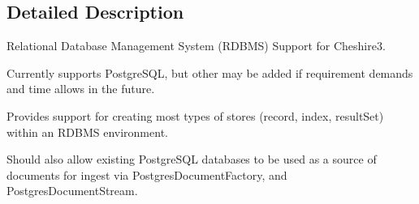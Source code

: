 \subsection{Detailed Description}
\begin{DoxyVerb}Relational Database Management System  (RDBMS) Support for Cheshire3.

Currently supports PostgreSQL, but other may be added if requirement demands
and time allows in the future.

Provides support for creating most types of stores (record, index, resultSet)
within an RDBMS environment.

Should also allow existing PostgreSQL databases to be used as a source of
documents for ingest via PostgresDocumentFactory, and PostgresDocumentStream.
\end{DoxyVerb}
 